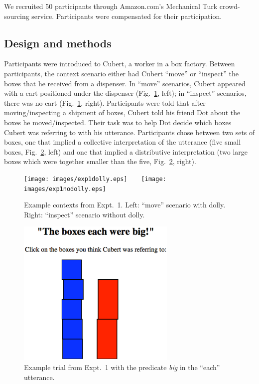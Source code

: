 \documentclass[linguex]{sp}
\begin{document}
We recruited 50 participants through Amazon.com's Mechanical Turk crowd-sourcing service. Participants were compensated for their participation.


\subsection{Design and methods}

Participants were introduced to Cubert, a worker in a box factory. Between participants, the context scenario either had Cubert ``move'' or ``inspect'' the boxes that he received from a dispenser. In ``move'' scenarios, Cubert appeared with a cart positioned under the dispenser (Fig.~\ref{expt1context}, left); in ``inspect'' scenarios, there was no cart (Fig.~\ref{expt1context}, right). Participants were told that after moving/inspecting a shipment of boxes, Cubert told his friend Dot about the boxes he moved/inspected. Their task was to help Dot decide which boxes Cubert was referring to with his utterance. Participants chose between two sets of boxes, one that implied a collective interpretation of the utterance (five small boxes, Fig.\ \ref{expt1trial}, left) and one that implied a distributive interpretation (two large boxes which were together smaller than the five, Fig.\ \ref{expt1trial}, right).

\begin{figure}[h]
	\centering
	\texttt{[image: images/exp1dolly.eps]}\ \ \ \ 
	\texttt{[image: images/exp1nodolly.eps]}
	\caption{Example contexts from Expt.~1. Left: ``move'' scenario with dolly. Right: ``inspect'' scenario without dolly.}\label{expt1context}
\end{figure}

\begin{figure}[h]
	\centering
	\includegraphics[width=3in]{images/trial2.eps}
	\caption{Example trial from Expt.~1 with the predicate \emph{big} in the ``each'' utterance.}\label{expt1trial}
\end{figure}
\end{document}
